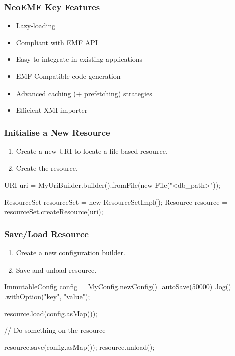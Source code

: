 \documentclass[10pt]{beamer}
\begin{document}
\begin{frame}[c]\frametitle{NeoEMF Key Features}
	\begin{itemize}
	\item Lazy-loading
	\item Compliant with EMF API
	\item Easy to integrate in existing applications
	\item EMF-Compatible code generation
	\item Advanced caching (+ prefetching) strategies
	\item Efficient XMI importer
	\end{itemize}
\end{frame}

\begin{frame}[fragile]\frametitle{Initialise a New Resource}
	\begin{enumerate}
	\item Create a new URI to locate a file-based resource.
	\item Create the resource.
	\end{enumerate}
	
  \begin{java}
    URI uri = MyUriBuilder.builder().fromFile(new File("<db_path>"));

    ResourceSet resourceSet = new ResourceSetImpl();
    Resource resource = resourceSet.createResource(uri);
  \end{java}
\end{frame}

\begin{frame}[fragile]\frametitle{Save/Load Resource}
	
	\begin{enumerate}
	\item Create a new configuration builder.
	\item Save and unload resource.
	\end{enumerate}
  \begin{java}
    ImmutableConfig config = MyConfig.newConfig()
    .autoSave(50000)              
    .log()                        
    .withOption("key", "value");  

    resource.load(config.asMap()); 

    // Do something on the resource

    resource.save(config.asMap()); 
    resource.unload();
  \end{java}
	
\end{frame}
\end{document}
